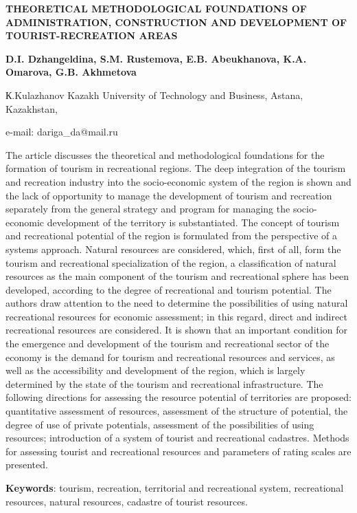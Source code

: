 \begin{center}
{\large\bfseries THEORETICAL METHODOLOGICAL FOUNDATIONS OF ADMINISTRATION,
CONSTRUCTION AND DEVELOPMENT OF TOURIST-RECREATION AREAS}

{\bfseries D.I. Dzhangeldina, S.M. Rustemova, E.B. Abeukhanova, K.A. Omarova, G.B. Akhmetova}

К.Kulazhanov Kazakh University of Technology and Business, Astana,
Kazakhstan,

e-mail: dariga\_da@mail.ru
\end{center}

The article discusses the theoretical and methodological foundations for
the formation of tourism in recreational regions. The deep integration
of the tourism and recreation industry into the socio-economic system of
the region is shown and the lack of opportunity to manage the
development of tourism and recreation separately from the general
strategy and program for managing the socio-economic development of the
territory is substantiated. The concept of tourism and recreational
potential of the region is formulated from the perspective of a systems
approach. Natural resources are considered, which, first of all, form
the tourism and recreational specialization of the region, a
classification of natural resources as the main component of the tourism
and recreational sphere has been developed, according to the degree of
recreational and tourism potential. The authors draw attention to the
need to determine the possibilities of using natural recreational
resources for economic assessment; in this regard, direct and indirect
recreational resources are considered. It is shown that an important
condition for the emergence and development of the tourism and
recreational sector of the economy is the demand for tourism and
recreational resources and services, as well as the accessibility and
development of the region, which is largely determined by the state of
the tourism and recreational infrastructure. The following directions
for assessing the resource potential of territories are proposed:
quantitative assessment of resources, assessment of the structure of
potential, the degree of use of private potentials, assessment of the
possibilities of using resources; introduction of a system of tourist
and recreational cadastres. Methods for assessing tourist and
recreational resources and parameters of rating scales are presented.

{\bfseries Keywords}: tourism, recreation, territorial and recreational
system, recreational resources, natural resources, cadastre of tourist
resources.

